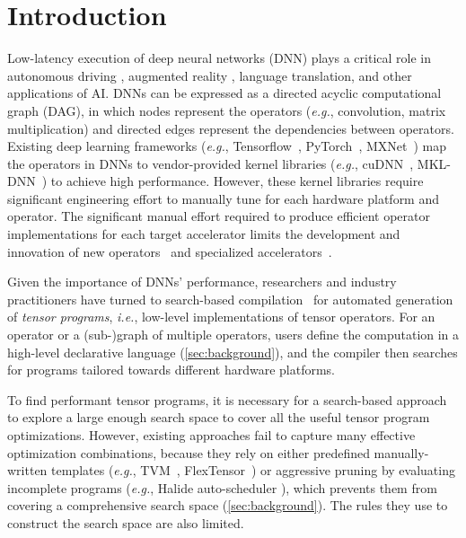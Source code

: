 \section{Introduction}

Low-latency execution of deep neural networks (DNN) plays a critical role in autonomous driving \cite{cordts2016cityscapes}, augmented reality \cite{alhaija2017augmented}, language translation\cite{devlin2018bert}, and other applications of AI.
DNNs can be expressed as a directed acyclic computational graph (DAG), in which nodes represent the operators (\textit{e.g.}, convolution, matrix multiplication) and directed edges represent the dependencies between operators.
Existing deep learning frameworks (\textit{e.g.}, Tensorflow~\cite{abadi2016tensorflow}, PyTorch~\cite{paszke2019pytorch}, MXNet~\cite{chen2015mxnet}) map the operators in DNNs to vendor-provided kernel libraries (\textit{e.g.}, cuDNN~\cite{chetlur2014cudnn}, MKL-DNN~\cite{intel2017mkldnn}) to achieve high performance.
However, these kernel libraries require significant engineering effort to manually tune for each hardware platform and operator.
The significant manual effort required to produce efficient operator implementations for each target accelerator limits the development and innovation of new operators~\cite{barham2019machine} and specialized accelerators~\cite{moreau2019hardware}.

Given the importance of DNNs' performance, researchers and industry practitioners have turned to search-based compilation~\cite{chen2018tvm, adams2019learning,zheng2020flextensor,vasilache2018tensor,liu2019optimizing} for automated generation of \emph{tensor programs}, \textit{i.e.}, low-level implementations of tensor operators. 
For an operator or a (sub-)graph of multiple operators, users define the computation in a high-level declarative language (\autoref{sec:background}), and the compiler then searches for programs tailored towards different hardware platforms.

To find performant tensor programs, it is necessary for a search-based approach to explore a large enough search space to cover all the useful tensor program optimizations. 
However, existing approaches fail to capture many effective optimization combinations, because they rely on either predefined manually-written templates (\textit{e.g.}, TVM~\cite{chen2018learning}, FlexTensor~\cite{zheng2020flextensor}) or aggressive pruning by evaluating incomplete programs (\textit{e.g.}, Halide auto-scheduler \cite{adams2019learning}), which prevents them from covering a comprehensive search space (\autoref{sec:background}).
The rules they use to construct the search space are also limited.

